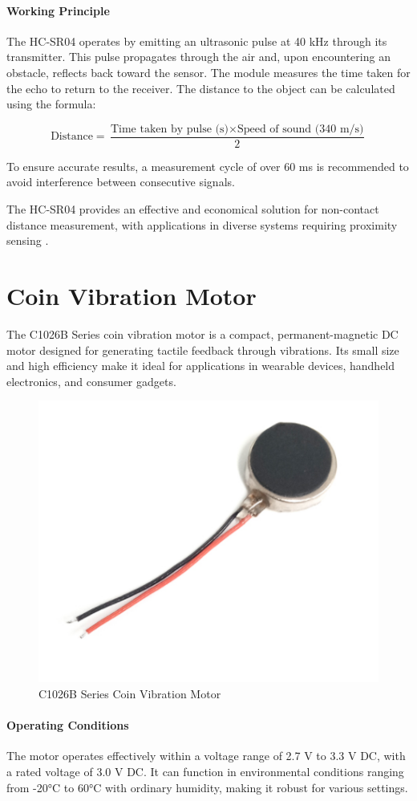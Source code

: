 \paragraph{Working Principle}

The HC-SR04 operates by emitting an ultrasonic pulse at 40 kHz through its transmitter. This pulse propagates through the air and, upon encountering an obstacle, reflects back toward the sensor. The module measures the time taken for the echo to return to the receiver. The distance to the object can be calculated using the formula:

\[
\text{Distance} = \frac{\text{Time taken by pulse (s)} \times \text{Speed of sound (340 m/s)}}{2}
\]

To ensure accurate results, a measurement cycle of over 60 ms is recommended to avoid interference between consecutive signals.



The HC-SR04 provides an effective and economical solution for non-contact distance measurement, with applications in diverse systems requiring proximity sensing \cite{HCSR04Datasheet}. 


\section{Coin Vibration Motor}

The C1026B Series coin vibration motor is a compact, permanent-magnetic DC motor designed for generating tactile feedback through vibrations. Its small size and high efficiency make it ideal for applications in wearable devices, handheld electronics, and consumer gadgets.

\begin{figure}[h]
	\centering
	\includegraphics[width=0.4\linewidth]{assets/ch2/vibration_motor}
	\caption{C1026B Series Coin Vibration Motor}
	\label{fig:coin_motor}
\end{figure}

\paragraph{Operating Conditions}
The motor operates effectively within a voltage range of 2.7 V to 3.3 V DC, with a rated voltage of 3.0 V DC. It can function in environmental conditions ranging from -20°C to 60°C with ordinary humidity, making it robust for various settings. 

